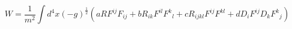 \begin{equation}
W= \frac{1}{m^{2}}\int{d^{4}x (-g)^{\frac{1}{2}}(aRF^{ij}F_{ij}+bR_{ik}F^{il}{F^{k}}_{l}+cR_{ijkl}F^{ij}F^{kl}+dD_{i}F^{ij}D_{k}{F^{k}}_{j})}
\label{1}
\end{equation}

